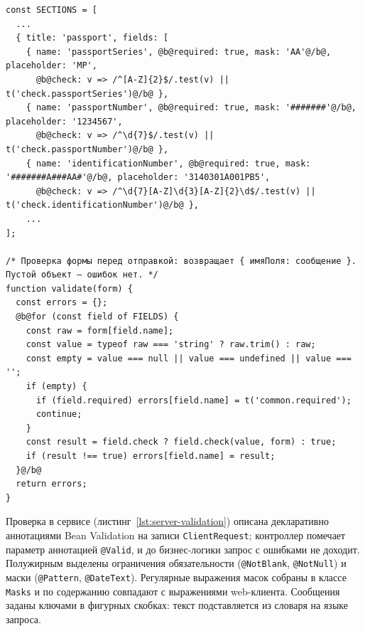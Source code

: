 \documentclass[14pt,a4paper]{extarticle}
\begin{document}
\begin{lstlisting}[style=js, style=marked, caption={Первичная проверка в web-клиенте (\texttt{static/app.js})}, label={lst:client-validation}]
const SECTIONS = [
  ...
  { title: 'passport', fields: [
    { name: 'passportSeries', @b@required: true, mask: 'AA'@/b@, placeholder: 'MP',
      @b@check: v => /^[A-Z]{2}$/.test(v) || t('check.passportSeries')@/b@ },
    { name: 'passportNumber', @b@required: true, mask: '#######'@/b@, placeholder: '1234567',
      @b@check: v => /^\d{7}$/.test(v) || t('check.passportNumber')@/b@ },
    { name: 'identificationNumber', @b@required: true, mask: '#######A###AA#'@/b@, placeholder: '3140301A001PB5',
      @b@check: v => /^\d{7}[A-Z]\d{3}[A-Z]{2}\d$/.test(v) || t('check.identificationNumber')@/b@ },
    ...
];

/* Проверка формы перед отправкой: возвращает { имяПоля: сообщение }. Пустой объект — ошибок нет. */
function validate(form) {
  const errors = {};
  @b@for (const field of FIELDS) {
    const raw = form[field.name];
    const value = typeof raw === 'string' ? raw.trim() : raw;
    const empty = value === null || value === undefined || value === '';
    if (empty) {
      if (field.required) errors[field.name] = t('common.required');
      continue;
    }
    const result = field.check ? field.check(value, form) : true;
    if (result !== true) errors[field.name] = result;
  }@/b@
  return errors;
}
\end{lstlisting}

Проверка в сервисе (листинг~\ref{lst:server-validation}) описана декларативно аннотациями
Bean Validation на записи \texttt{ClientRequest}; контроллер помечает параметр аннотацией
\texttt{@Valid}, и до бизнес-логики запрос с ошибками не доходит. Полужирным выделены
ограничения обязательности (\texttt{@NotBlank}, \texttt{@NotNull}) и маски (\texttt{@Pattern},
\texttt{@DateText}). Регулярные выражения масок собраны в классе \texttt{Masks} и по
содержанию совпадают с выражениями web-клиента. Сообщения заданы ключами в фигурных скобках:
текст подставляется из словаря на языке запроса.
\end{document}

